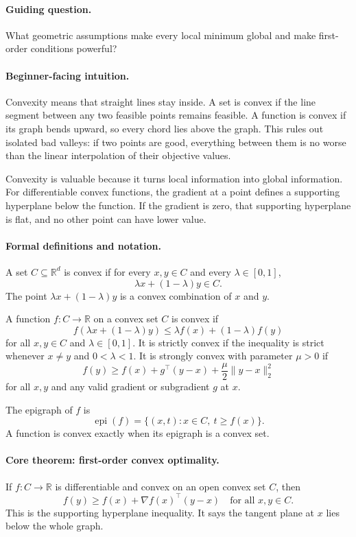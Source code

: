 \paragraph{Guiding question.}
What geometric assumptions make every local minimum global and make first-order conditions powerful?

\paragraph{Beginner-facing intuition.}
Convexity means that straight lines stay inside. A set is convex if the line segment between any two feasible points remains feasible. A function is convex if its graph bends upward, so every chord lies above the graph. This rules out isolated bad valleys: if two points are good, everything between them is no worse than the linear interpolation of their objective values.

Convexity is valuable because it turns local information into global information. For differentiable convex functions, the gradient at a point defines a supporting hyperplane below the function. If the gradient is zero, that supporting hyperplane is flat, and no other point can have lower value.

\paragraph{Formal definitions and notation.}
A set \(C\subseteq\mathbb R^d\) is convex if for every \(x,y\in C\) and every \(\lambda\in[0,1]\),
\[
\lambda x+(1-\lambda)y\in C.
\]
The point \(\lambda x+(1-\lambda)y\) is a convex combination of \(x\) and \(y\).

A function \(f:C\to\mathbb R\) on a convex set \(C\) is convex if
\[
\boxed{
f(\lambda x+(1-\lambda)y)
\le
\lambda f(x)+(1-\lambda)f(y)
}
\]
for all \(x,y\in C\) and \(\lambda\in[0,1]\). It is strictly convex if the inequality is strict whenever \(x\neq y\) and \(0<\lambda<1\). It is strongly convex with parameter \(\mu>0\) if
\[
f(y)\ge f(x)+g^\top(y-x)+\frac{\mu}{2}\|y-x\|_2^2
\]
for all \(x,y\) and any valid gradient or subgradient \(g\) at \(x\).

The epigraph of \(f\) is
\[
\operatorname{epi}(f)=\{(x,t):x\in C,\ t\ge f(x)\}.
\]
A function is convex exactly when its epigraph is a convex set.

\paragraph{Core theorem: first-order convex optimality.}
If \(f:C\to\mathbb R\) is differentiable and convex on an open convex set \(C\), then
\[
\boxed{
f(y)\ge f(x)+\nabla f(x)^\top(y-x)
\quad\text{for all }x,y\in C.
}
\]
This is the supporting hyperplane inequality. It says the tangent plane at \(x\) lies below the whole graph.

